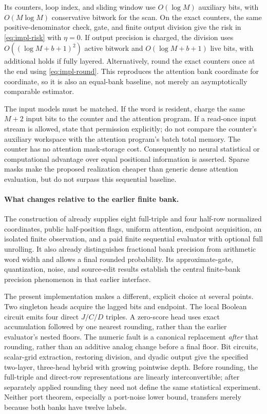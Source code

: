 Its counters, loop index, and sliding window use $O(\log M)$ auxiliary
bits, with $O(M\log M)$ conservative bitwork for the scan. On the exact
counters, the same positive-denominator check, gate, and finite output
division give the risk in \eqref{eq:impl-risk} with $\eta=0$.
If output precision is charged, the division uses
$O((\log M+b+1)^2)$ active bitwork and
$O(\log M+b+1)$ live bits, with additional holds if fully layered.
Alternatively, round the exact counters once at the end using
\eqref{eq:impl-round}. This reproduces the attention bank coordinate for
coordinate, so it is also an equal-bank baseline, not merely an
asymptotically comparable estimator.

The input models must be matched. If the word is resident, charge the
same $M+2$ input bits to the counter and the attention program. If a
read-once input stream is allowed, state that permission explicitly; do
not compare the counter's auxiliary workspace with the attention
program's batch total memory. The counter has no attention mask-storage
cost. Consequently no neural statistical or computational advantage over
equal positional information is asserted. Sparse masks make the proposed
realization cheaper than generic dense attention evaluation, but do not
surpass this sequential baseline.

\paragraph{What changes relative to the earlier finite bank.}
The construction of \citet{BCJ001} already supplies eight full-triple and
four half-row normalized coordinates, public half-position flags,
uniform attention, endpoint acquisition, an isolated finite observation,
and a paid finite sequential evaluator with optional full unrolling. It
also already distinguishes fractional bank precision from arithmetic word
width and allows a final rounded probability. Its approximate-gate,
quantization, noise, and source-edit results establish the central
finite-bank precision phenomenon in that earlier interface.

The present implementation makes a different, explicit choice at several
points. Two singleton heads acquire the lagged bits and endpoint. The
local Boolean circuit emits four direct $J/C/D$ triples. A zero-score
head uses exact accumulation followed by one nearest rounding, rather
than the earlier evaluator's nested floors. The numeric fault is a
canonical replacement \emph{after} that rounding, rather than an additive
analog change before a final floor. Bit circuits, scalar-grid extraction,
restoring division, and dyadic output give the specified two-layer,
three-head hybrid with growing pointwise depth. Before rounding, the
full-triple and direct-row representations are linearly interconvertible;
after separately applied rounding they need not define the same
statistical experiment. Neither port theorem, especially a port-noise
lower bound, transfers merely because both banks have twelve labels.

